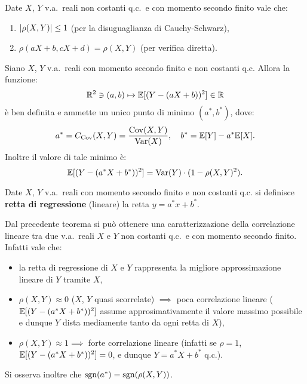 \begin{multicols*}{2}
\begin{lemma}
    Date $X$, $Y$ v.a.~reali non costanti q.c.~e con momento secondo finito vale che:
    \begin{enumerate}[(i.)]
        \item $\left\lvert \rho(X, Y) \right\rvert \leq 1$ (per la disuguaglianza di Cauchy-Schwarz),
        \item $\rho(aX + b, cX + d) = \rho(X, Y)$ (per verifica diretta).
    \end{enumerate}
\end{lemma}

\begin{theorem}
    Siano $X$, $Y$ v.a.~reali con momento secondo finito e non costanti q.c. Allora
    la funzione:
    \[
        \mathbb{R}^2 \ni (a, b) \mapsto \mathbb{E}[(Y - (aX + b))^2] \in \mathbb{R}
    \]
    è ben definita e ammette un unico punto di minimo $(a^*, b^*)$, dove:
    \[
        a^* = C_{\operatorname{Cov}}(X, Y) = \frac{\operatorname{Cov}(X, Y)}{\operatorname{Var}(X)}, \quad b^* = \mathbb{E}[Y] - a^* \mathbb{E}[X].
    \]
    Inoltre il valore di tale minimo è:
    \[
        \mathbb{E}[(Y - (a^* X + b^*))^2] = \operatorname{Var}(Y) \cdot (1 - \rho(X, Y)^2).
    \]
\end{theorem}

\begin{definition}
    Date $X$, $Y$ v.a.~reali con momento secondo finito e non costanti q.c.
    si definisce \textbf{retta di regressione} (lineare) la retta $y = a^*x + b^*$.
\end{definition}

\begin{remark}
    Dal precedente teorema si può ottenere una caratterizzazione della
    correlazione lineare tra due v.a.~reali $X$ e $Y$ non costanti q.c.~e con
    momento secondo finito. Infatti vale che:
    \begin{itemize}
        \item la retta di regressione di $X$ e $Y$ rappresenta la migliore approssimazione
        lineare di $Y$ tramite $X$,
        
        \item $\rho(X, Y) \approx 0$ ($X$, $Y$ quasi scorrelate) $\implies$ poca correlazione lineare ($\mathbb{E}[(Y - (a^* X + b^*))^2]$ assume approsimativamente il valore massimo possibile e dunque $Y$
        dista mediamente tanto da ogni retta di $X$),
        \item $\rho(X, Y) \approx 1 \implies$ forte correlazione lineare (infatti se
        $\rho = 1$, $\mathbb{E}[(Y - (a^* X + b^*))^2] = 0$, e dunque $Y = a^* X + b^*$ q.c.).
    \end{itemize}
    Si osserva inoltre che $\operatorname{sgn}(a^*) = \operatorname{sgn}(\rho(X, Y))$.
\end{remark}


\end{multicols*}
